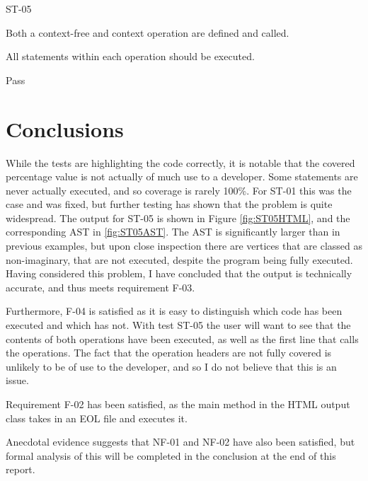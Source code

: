 \begin{samepage}
\begin{description}[style=sameline,leftmargin=3.5cm,nolistsep]
\item[\hspace*{0.3cm}Label] ST-05
\item[\hspace*{0.3cm}Description] Both a context-free and context operation are defined and called.
\item[\hspace*{0.3cm}Expected Output] All statements within each operation should be executed.
\item[\hspace*{0.3cm}Result] Pass
\end{description}
\end{samepage}

\section{Conclusions}

While the tests are highlighting the code correctly, it is notable that the covered percentage value is not actually of much use to a developer. Some statements are never actually executed, and so coverage is rarely 100\%. For ST-01 this was the case and was fixed, but further testing has shown that the problem is quite widespread. The output for ST-05 is shown in Figure \ref{fig:ST05HTML}, and the corresponding AST in \ref{fig:ST05AST}. The AST is significantly larger than in previous examples, but upon close inspection there are vertices that are classed as non-imaginary, that are not executed, despite the program being fully executed. Having considered this problem, I have concluded that the output is technically accurate, and thus meets requirement F-03. 

Furthermore, F-04 is satisfied as it is easy to distinguish which code has been executed and which has not. With test ST-05 the user will want to see that the contents of both operations have been executed, as well as the first line that calls the operations. The fact that the operation headers are not fully covered is unlikely to be of use to the developer, and so I do not believe that this is an issue.

Requirement F-02 has been satisfied, as the main method in the HTML output class takes in an EOL file and executes it. 

Anecdotal evidence suggests that NF-01 and NF-02 have also been satisfied, but formal analysis of this will be completed in the conclusion at the end of this report.

